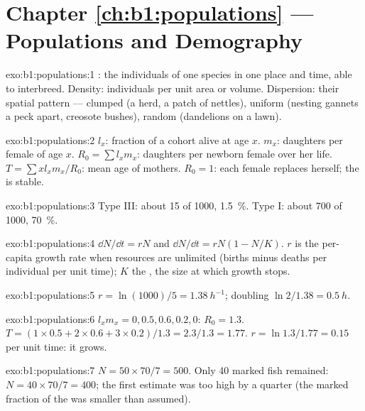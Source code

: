 \section*{Chapter \ref{ch:b1:populations} --- Populations and Demography}

\begin{solution}{exo:b1:populations:1}
: the individuals of one species in one place and time,
able to interbreed. Density: individuals per unit area or volume.
Dispersion: their spatial pattern --- clumped (a herd, a patch of
nettles), uniform (nesting gannets a peck apart, creosote bushes),
random (dandelions on a lawn).
\end{solution}

\begin{solution}{exo:b1:populations:2}
$l_x$: fraction of a cohort alive at age $x$. $m_x$: daughters per
female of age $x$. $R_0 = \sum l_x m_x$: daughters per newborn female
over her life. $T = \sum x l_x m_x / R_0$: mean age of mothers.
$R_0 = 1$: each female replaces herself; the  is stable.
\end{solution}

\begin{solution}{exo:b1:populations:3}
Type III: about 15 of 1000, \qty{1.5}{\%}. Type I: about 700 of
1000, \qty{70}{\%}.
\end{solution}

\begin{solution}{exo:b1:populations:4}
$\dd N/\dd t = rN$ and $\dd N/\dd t = rN(1 - N/K)$. $r$ is the
per-capita growth rate when resources are unlimited (births minus
deaths per individual per unit time); $K$ the , the
size at which growth stops.
\end{solution}

\begin{solution}{exo:b1:populations:5}
$r = \ln(1000)/5 = \qty{1.38}{h^{-1}}$; doubling $\ln 2/1.38 =
\qty{0.5}{h}$.
\end{solution}

\begin{solution}{exo:b1:populations:6}
$l_x m_x = 0, 0.5, 0.6, 0.2, 0$: $R_0 = 1.3$. $T = (1\times 0.5 +
2\times 0.6 + 3\times 0.2)/1.3 = 2.3/1.3 = 1.77$. $r = \ln 1.3/1.77 =
\qty{0.15}{}$ per unit time: it grows.
\end{solution}

\begin{solution}{exo:b1:populations:7}
$N = 50\times 70/7 = 500$. Only 40 marked fish remained: $N = 40\times
70/7 = 400$; the first estimate was too high by a quarter (the marked
fraction of the  was smaller than assumed).
\end{solution}

